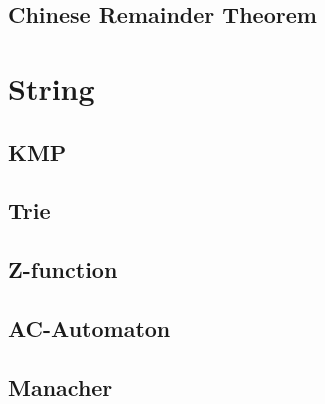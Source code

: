 \subsection{Chinese Remainder Theorem}
\raggedbottom
\hrulefill
\section{String}
\subsection{KMP}
\raggedbottom
\subsection{Trie}
\raggedbottom
\subsection{Z-function}
\raggedbottom
\subsection{AC-Automaton}
\raggedbottom
\subsection{Manacher}
\raggedbottom
\hrulefill
\pagebreak
